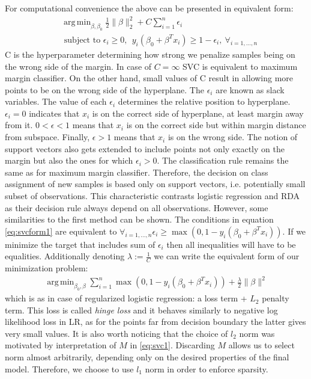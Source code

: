 \documentclass[shortabstract, english, mgr]{iithesis}
\DeclareMathOperator*{\argmin}{arg\,min}
\begin{document}
For computational convenience the above can be presented in equivalent form:
\begin{align}
& \argmin_{\beta, \beta_0} \frac{1}{2}\|\beta\|^2_2 + C \sum_{i=1}^n \epsilon_i \nonumber \\ &{\text { subject to }}\epsilon_i \geq 0, \ \  y_{i}\left(\beta_{0}+\beta^T x_i\right) \geq 1 - \epsilon_i, \ \forall_{i=1, \ldots, n} \label{eq:svcform1}
\end{align}
C is the hyperparameter determining how strong we penalize samples being on the wrong side of the margin. In case of $C = \infty$ SVC is equivalent to maximum margin classifier. On the other hand, small values of C result in allowing more points to be on the wrong side of the hyperplane. The $\epsilon_i$ are known as slack variables. The value of each $\epsilon_i$ determines the relative position to hyperplane. $\epsilon_i=0$ indicates that $x_i$ is on the correct side of hyperplane, at least margin away from it. $0< \epsilon < 1$ means that $x_i$ is on the correct side but within margin distance from subspace. Finally, $\epsilon > 1$ means that $x_i$ is on the wrong side. The notion of support vectors also gets extended to include points not only exactly on the margin but also the ones for which $\epsilon_i > 0$. The classification rule remains the same as for maximum margin classifier. Therefore, the decision on class assignment of new samples is based only on support vectors, i.e. potentially small subset of observations. This characteristic contrasts logistic regression and RDA as their decision rule always depend on all observations. However, some similarities to the first method can be shown. The conditions in equation \ref{eq:svcform1} are equivalent to $\forall_{i=1, \ldots, n} \epsilon_i \geq \max \left(0, 1 - y_i(\beta_0 + \beta^Tx_i) \right)$. If we minimize the target that includes sum of $\epsilon_i$ then all inequalities will have to be equalities. Additionally denoting $\lambda := \frac{1}{C}$ we can write the equivalent form of our minimization problem:
\begin{align*}
    \argmin_{\beta_0, \beta} \sum_{i=1}^n \max \left(0, 1 - y_i(\beta_0 + \beta^Tx_i)\right) + \frac{\lambda}{2} \|\beta\|^2
\end{align*}
which is as in case of regularized logistic regression: a loss term + $L_2$ penalty term. This loss is called \textit{hinge loss} and it behaves similarly to negative log likelihood loss in LR, as for the points far from decision boundary the latter gives very small values. It is also worth noticing that the choice of $l_2$ norm was motivated by interpretation of $M$ in \ref{eq:svc1}. Discarding $M$ allows us to select norm almost arbitrarily, depending only on the desired properties of the final model. Therefore, we choose to use $l_1$ norm in order to enforce sparsity. 
\end{document}
